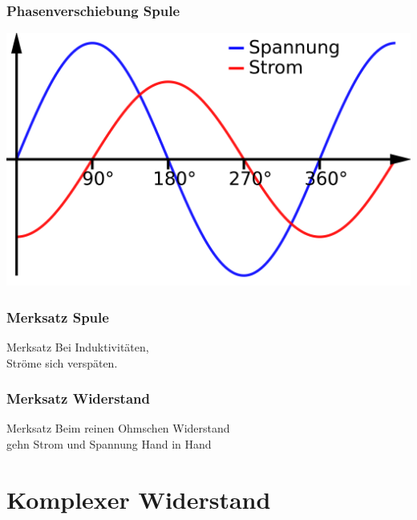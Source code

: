\begin{frame}
    \frametitle{Phasenverschiebung Spule}
	\begin{center}
        \includegraphics[width=1\textwidth,height=.85\textheight,keepaspectratio]{a03/Phasenverschiebung_induktiv.png}
        \tiny \hyperlink{refs}{\cite{wc}}
    \end{center}
\end{frame}

\begin{frame}
  \frametitle{Merksatz Spule}
  \begin{block}{Merksatz}
    Bei Induktivitäten,\\
    Ströme sich verspäten.
  \end{block}
\end{frame}

\begin{frame}
  \frametitle{Merksatz Widerstand}
  \begin{block}{Merksatz}
    Beim reinen Ohmschen Widerstand\\
    gehn Strom und Spannung Hand in Hand
  \end{block}
\end{frame}

\section*{Komplexer Widerstand}

